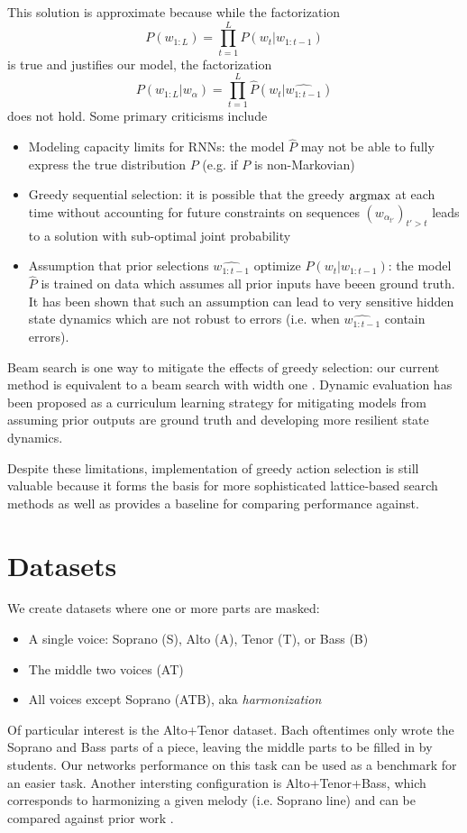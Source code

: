 \documentclass[dissertation.tex]{subfiles}
\begin{document}
This solution is approximate because while the factorization
\begin{equation}
  P(w_{1:L}) = \prod_{t=1}^L P(w_t | w_{1:t-1})
\end{equation}
is true and justifies our model, the factorization
\begin{equation}
  P(w_{1:L} | w_{\alpha}) = \prod_{t=1}^L \hat{P}(w_t | \hat{w_{1:t-1}} )
\end{equation}
does not hold. Some primary criticisms include
\begin{itemize}
  \item Modeling capacity limits for RNNs: the model $\hat{P}$ may not be able to fully express
    the true distribution $P$ (e.g. if $P$ is non-Markovian)
  \item Greedy sequential selection: it is possible that the greedy $\operatorname*{argmax}$ at each
    time without accounting for future constraints on sequences $(w_{\alpha_{t'}})_{t' > t}$
    leads to a solution with sub-optimal joint probability
  \item Assumption that prior selections $\hat{w_{1:t-1}}$ optimize $P(w_t | w_{1:t-1})$:
    the model $\hat{P}$ is trained on data which assumes all prior inputs have beeen
    ground truth. It has been shown  that such an assumption can lead to
    very sensitive hidden state dynamics which are not robust to errors (i.e. when
    $\hat{w_{1:t-1}}$ contain errors).
\end{itemize}
Beam search is one way to mitigate the effects of greedy selection: our current method
is equivalent to a beam search with width one .
Dynamic evaluation  has been proposed as a curriculum learning strategy for
mitigating models from assuming prior outputs are ground truth and developing more resilient
state dynamics.

Despite these limitations, implementation of greedy action selection is still valuable
because it forms the basis for more sophisticated lattice-based search methods as well as
provides a baseline for comparing performance against.

\section{Datasets}

We create datasets where one or more parts are masked:
\begin{itemize}
  \item A single voice: Soprano (S), Alto (A), Tenor (T), or Bass (B)
  \item The middle two voices (AT)
  \item All voices except Soprano (ATB), aka \emph{harmonization}
\end{itemize}
Of particular interest is the Alto+Tenor dataset. Bach oftentimes only wrote
the Soprano and Bass parts of a piece, leaving the middle parts to be filled in
by students. Our networks performance on this task can be used as a benchmark
for an easier task. Another intersting configuration is Alto+Tenor+Bass, which
corresponds to harmonizing a given melody (i.e. Soprano line) and can be
compared against prior work .
\end{document}
